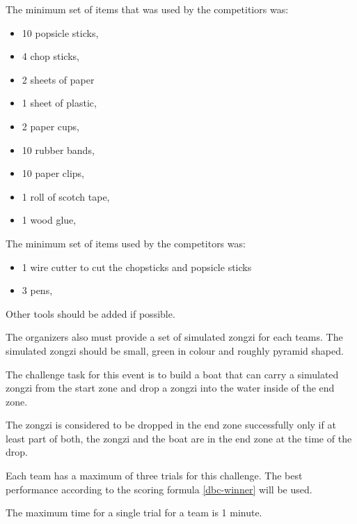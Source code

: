 \documentclass[12pt]{hurocup}
\begin{document}
\begin{lawlist}[DBC]

\item \label{dbc-items} The minimum set of items that was used by the
  competitiors was:

  \begin{itemize}
    \item 10 popsicle sticks,
    \item 4 chop sticks,
    \item 2 sheets of paper 
    \item 1 sheet of plastic,
    \item 2 paper cups,
    \item 10 rubber bands,
    \item 10 paper clips,
    \item 1 roll of scotch tape,
    \item 1 wood glue,      
  \end{itemize}

\item \label{dbc-tools} The minimum set of items used by the
  competitors was:

  \begin{itemize}
    \item 1 wire cutter to cut the chopsticks and popsicle sticks
    \item 3 pens,
  \end{itemize}
  Other tools should be added if possible.

\item \label{dbc-additional} The organizers also must provide a set of
  simulated zongzi for each teams. The simulated zongzi should be
  small, green in colour and roughly pyramid shaped.

\end{lawlist}

\label{dbc-game-play}

\begin{lawlist}[DBC]

\item The challenge task for this event is to build a boat that can
  carry a simulated zongzi from the start zone and drop a zongzi into
  the water inside of the end zone.

\item The zongzi is considered to be dropped in the end zone
  successfully only if at least part of both, the zongzi and the boat
  are in the end zone at the time of the drop.

\item Each team has a maximum of three trials for this challenge. The
  best performance according to the scoring formula \ref{dbc-winner}
  will be used.

\item The maximum time for a single trial for a team is 1 minute.

\end{lawlist}
\end{document}
